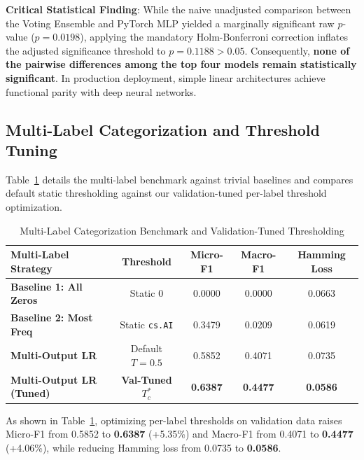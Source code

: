 \documentclass[journal]{IEEEtran}
\begin{document}
\textbf{Critical Statistical Finding}: While the naive unadjusted comparison between the Voting Ensemble and PyTorch MLP yielded a marginally significant raw $p$-value ($p = 0.0198$), applying the mandatory Holm-Bonferroni correction inflates the adjusted significance threshold to \textbf{$p = 0.1188 > 0.05$}. Consequently, \textbf{none of the pairwise differences among the top four models remain statistically significant}. In production deployment, simple linear architectures achieve functional parity with deep neural networks.

\subsection{Multi-Label Categorization and Threshold Tuning}
Table~\ref{tab:multilabel} details the multi-label benchmark against trivial baselines and compares default static thresholding against our validation-tuned per-label threshold optimization.

\begin{table}[t]
\caption{Multi-Label Categorization Benchmark and Validation-Tuned Thresholding}
\label{tab:multilabel}
\centering
\small
\begin{tabular}{lcccc}
\toprule
\textbf{Multi-Label Strategy} & \textbf{Threshold} & \textbf{Micro-F1} & \textbf{Macro-F1} & \textbf{Hamming Loss} \\
\midrule
\textbf{Baseline 1: All Zeros} & Static 0 & 0.0000 & 0.0000 & 0.0663 \\
\textbf{Baseline 2: Most Freq} & Static \texttt{cs.AI} & 0.3479 & 0.0209 & 0.0619 \\
\textbf{Multi-Output LR} & Default $T = 0.5$ & 0.5852 & 0.4071 & 0.0735 \\
\textbf{Multi-Output LR (Tuned)} & \textbf{Val-Tuned $T_c^*$} & \textbf{0.6387} & \textbf{0.4477} & \textbf{0.0586} \\
\bottomrule
\end{tabular}
\end{table}

As shown in Table~\ref{tab:multilabel}, optimizing per-label thresholds on validation data raises Micro-F1 from 0.5852 to \textbf{0.6387} (+5.35\%) and Macro-F1 from 0.4071 to \textbf{0.4477} (+4.06\%), while reducing Hamming loss from 0.0735 to \textbf{0.0586}.
\end{document}
